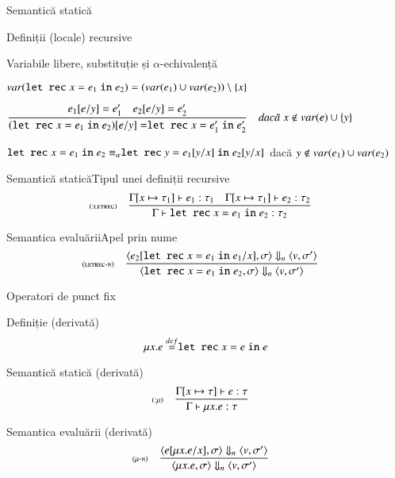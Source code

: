 \begin{section}{Semantică statică}
\begin{subsection}{Definiții (locale) recursive}
\begin{frame}{Variabile libere, substituție și $\alpha$-echivalență}
\begin{itemize}
\vitem $\mathop{var}(\mathrel{\text{\ttfamily let rec}} x = e_1 \mathrel{\text{\ttfamily in}} e_2) = (\mathop{var}(e_1) \cup \mathop{var}(e_2)) \setminus \{x\}$

\vitem $\displaystyle\reg{(\Sletrec x = e_1 \Sin e_2)[e/y] = \Sletrec x = e_1' \Sin e_2'}{e_1[e/y] = e_1' \si e_2[e/y] = e_2'}{x\not\in \var(e)\cup \{ y\}}$

\vitem $\mathrel{\text{\ttfamily let rec}} x = e_1 \mathrel{\text{\ttfamily in}} e_2 \equiv_\alpha \mathrel{\text{\ttfamily let rec}} y = e_1[y/x] \mathrel{\text{\ttfamily in}} e_2[y/x]$ dacă $y\not\in \mathop{var}(e_1)\cup \mathop{var}(e_2)$
 
\end{itemize}
\end{frame}

\begin{frame}{Semantică statică}{Tipul unei definiții recursive}
\[\reg[:letrec]{\T{\Gamma}{\Sletrec x = e_1 \Sin e_2}{\tau_2}}{\T{\Gamma[x\mapsto \tau_1]}{e_1}{\tau_1}\si\T{\Gamma[x\mapsto \tau_1]}{e_2}{\tau_2}}{}
\]
\end{frame}

\begin{frame}{Semantica evaluării}{Apel prin nume}
\[\reg[letrec-n]{\c{\Sletrec x = e_1 \Sin e_2,\sigma}\Downarrow_n\c{v,\sigma'}}
{\c{e_2[\Sletrec x = e_1 \Sin e_1/x],\sigma}\Downarrow_n\c{v,\sigma'}}{}\]
\end{frame}

\begin{frame}{Operatori de punct fix}
\begin{block}{Definiție (derivată)}
\[\mu x . e \stackrel{def}{=} \mathrel{\text{\ttfamily let rec}} x = e \mathrel{\text{\ttfamily in}} e\]
\end{block}

\vfill
\begin{block}{Semantică statică (derivată)}
\[\reg[:$\mu$]{\T{\Gamma}{\mu x . e}{\tau}}{\T{\Gamma[x\mapsto \tau]}{e}{\tau}}{}\] 
\end{block}

\vfill
\begin{block}{Semantica evaluării (derivată)}
\[\reg[$\mu$-n]{\c{\mu x . e,\sigma}\Downarrow_n\c{v,\sigma'}}
{\c{e[\mu x . e /x],\sigma}\Downarrow_n\c{v,\sigma'}}{}\]
\end{block}

\end{frame}

\end{subsection}
\end{section}
